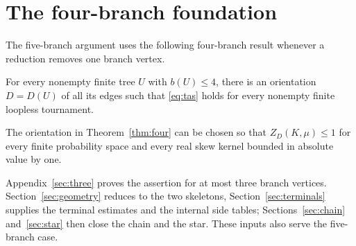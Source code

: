 \section{The four-branch foundation}\label{sec:four-foundation}
The five-branch argument uses the following four-branch result whenever
a reduction removes one branch vertex.
\begin{theorem}\label{thm:four}
For every nonempty finite tree $U$ with $b(U)\le4$, there is an
orientation $D=D(U)$ of all its edges such that \eqref{eq:tas} holds for
every nonempty finite loopless tournament.
\end{theorem}
\begin{theorem}\label{thm:four-kernel}
The orientation in Theorem~\ref{thm:four} can be chosen so that
$Z_D(K,\mu)\le1$ for every finite probability space and every real skew
kernel bounded in absolute value by one.
\end{theorem}
Appendix~\ref{sec:three} proves the assertion for at most three branch
vertices. Section~\ref{sec:geometry} reduces to the two skeletons,
Section~\ref{sec:terminals} supplies the terminal estimates and the
internal side tables; Sections~\ref{sec:chain} and~\ref{sec:star}
then close the chain and the star. These inputs also serve the five-branch
case.
